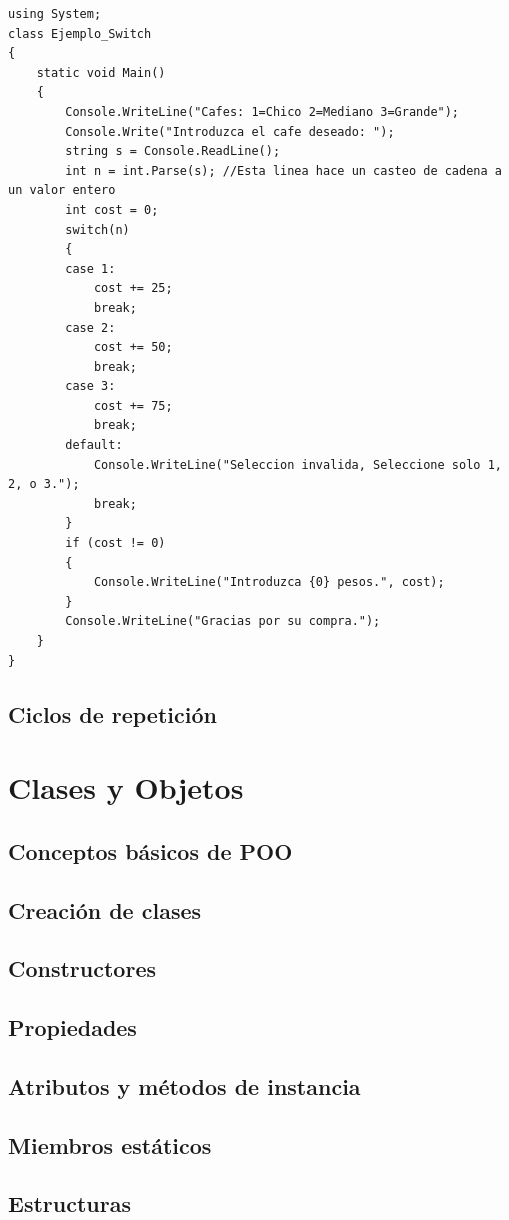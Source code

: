\documentclass[12pt,a4paper]{report}
\begin{document}
{\begin{lstlisting}
using System;
class Ejemplo_Switch 
{
    static void Main()
    {
        Console.WriteLine("Cafes: 1=Chico 2=Mediano 3=Grande"); 
        Console.Write("Introduzca el cafe deseado: "); 
        string s = Console.ReadLine(); 
        int n = int.Parse(s); //Esta linea hace un casteo de cadena a un valor entero
        int cost = 0;
        switch(n)
        {
        case 1:
            cost += 25;
            break;
        case 2:
            cost += 50;
            break;
        case 3:
            cost += 75;
            break;
        default:
            Console.WriteLine("Seleccion invalida, Seleccione solo 1, 2, o 3.");
            break;
        }
        if (cost != 0)
        {
            Console.WriteLine("Introduzca {0} pesos.", cost);
        }
        Console.WriteLine("Gracias por su compra.");
    }
}
\end{lstlisting}
\section{Ciclos de repetición}

\chapter{Clases y Objetos}
\section{Conceptos básicos de POO}
\section{Creación de clases}
\section{Constructores}
\section{Propiedades}
\section{Atributos y métodos de instancia}
\section{Miembros estáticos}
\section{Estructuras}
}
\end{document}
